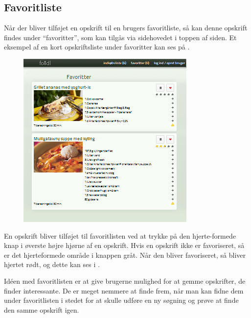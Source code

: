 \subsection{Favoritliste}
\label{subsec:brug-favoritliste}

Når der bliver tilføjet en opskrift til en brugers favoritliste, så kan denne opskrift findes under ``favoritter'', som kan tilgås via sidehovedet i toppen af siden. Et eksempel af en kort opskriftsliste under favoritter kan ses på .

\begin{figure}[H]
	\centering
	\includegraphics[scale=1]{billeder/foodl/thumbnails/favoritter.png}
	\label{fig:overblik-favoritter}
\end{figure}

En opskrift bliver tilføjet til favoritlisten ved at trykke på den hjerte-formede knap i øverste højre hjørne af en opskrift. Hvis en opskrift ikke er favoriseret, så er det hjerteformede område i knappen gråt. Når den bliver favoriseret, så bliver hjertet rødt, og dette kan ses i .

Idéen med favoritlisten er at give brugerne mulighed for at gemme opskrifter, de finder interessante. De er meget nemmere at finde frem, når man kan fidne dem under favoritlisten i stedet for at skulle udføre en ny søgning og prøve at finde den samme opskrift igen.